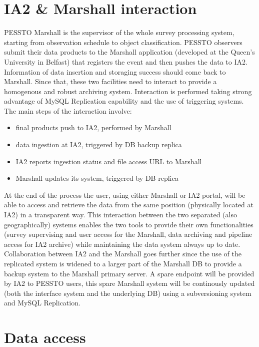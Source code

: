\documentclass[11pt,twoside]{article}
\begin{document}
\section{IA2 \& Marshall interaction}\label{ia2marshall}

PESSTO Marshall is the supervisor of the whole survey processing system, starting from observation schedule to object classification. PESSTO observers submit their data products to the Marshall application (developed at the Queen's University in Belfast) that registers the event and then pushes the data to IA2. Information of data insertion and storaging success should come back to Marshall. Since that, these two facilities need to interact to provide a homogenous and robust archiving system.
Interaction is performed taking strong advantage of MySQL Replication capability and the use of triggering systems. The main steps of the interaction involve:
\begin{itemize}[noitemsep,nolistsep]
	\item final products push to IA2, performed by Marshall
	\item data ingestion at IA2, triggered by DB backup replica
	\item IA2 reports ingestion status and file access URL to Marshall
	\item Marshall updates its system, triggered by DB replica
\end{itemize} 
At the end of the process the user, using either Marshall or IA2 portal, will be able to access and retrieve the data from the same position (physically located at IA2) in a transparent way.
This interaction between the two separated (also geographically) systems enables the two tools to provide their own functionalities (survey supervising and user access for the Marshall, data archiving and pipeline access for IA2 archive) while maintaining the data system always up to date.
Collaboration between IA2 and the Marshall goes further since the use of the replicated system is widened to a larger part of the Marshall DB to provide a backup system to the Marshall primary server. A spare endpoint will be provided by IA2 to PESSTO users, this spare Marshall system will be continously updated (both the interface system and the underlying DB) using a subversioning system and MySQL Replication.

\section{Data access}\label{dataaccess}
\end{document}
